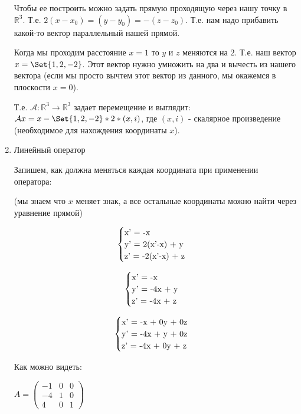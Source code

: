 \begin{enumerate}
    Чтобы ее построить можно задать прямую проходящую через нашу точку в $\mathbb{R}^3$. Т.е. $2(x-x_0)=(y-y_0)=-(z-z_0)$.
    Т.е. нам надо прибавить какой-то вектор параллельный нашей прямой.

    Когда мы проходим расстояние $x=1$ то $y$ и $z$ меняются на $2$.
    Т.е. наш вектор $x = \Set{1, 2, -2}$.
    Этот вектор нужно умножить на два и вычесть из нашего вектора
    (если мы просто вычтем этот вектор из данного, мы окажемся в плоскости $x=0$).

    Т.е. $\mathcal{A}: \mathbb{R}^3 \rightarrow \mathbb{R}^3$ задает перемещение и выглядит: $\mathcal{A}x = x - \Set{1,2,-2} * 2 * (x, i)$,
    где $(x,i)$ - скалярное произведение (необходимое для нахождения координаты $x$).

    \item Линейный оператор

    Запишем, как должна меняться каждая координата при применении оператора:

    (мы знаем что $x$ меняет знак, а все остальные координаты можно найти через уравнение прямой)

    \begin{equation*}
        \begin{cases}
            $x' = -x$\\
            $y' = 2(x'-x) + y$\\
            $z' = -2(x'-x) + z$
        \end{cases}
    \end{equation*}

    \begin{equation*}
        \begin{cases}
            $x' = -x$\\
            $y' = -4x + y$\\
            $z' = -4x + z$
        \end{cases}
    \end{equation*}

    \begin{equation*}
        \begin{cases}
            $x' = -x + 0y + 0z$\\
            $y' = -4x + y + 0z$\\
            $z' = -4x + 0y + z$
        \end{cases}
    \end{equation*}

    Как можно видеть:

    $ A =
    \begin{pmatrix}
        -1 & 0 & 0 \\
        -4 & 1 & 0 \\
        4  & 0 & 1
    \end{pmatrix}
    $


\end{enumerate}
